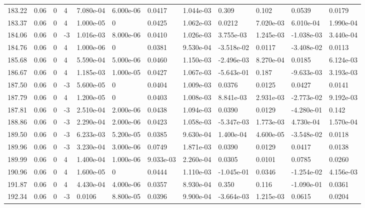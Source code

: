 \documentclass[preview]{standalone}
\begin{document}
{{{{{{{{{{\begin{tabular}{L{1.2cm}C{1.2cm} C{0.3cm}C{0.5cm} C{1.4cm}C{1.4cm} C{1.4cm}C{1.4cm} C{1.6cm}C{1.6cm} C{1.6cm}C{1.6cm}}
  183.22  &  0.06  & 0     &  4 &  7.080e-04  & 6.000e-06  &  0.0417&   1.044e-03& 0.309 & 0.102   &  0.0539 & 0.0179  \\ 
  183.37  &  0.06  & 0     &  4 &  1.000e-05  & 0  &  0.0425&   1.062e-03& 0.0212 & 7.020e-03   &  6.010e-04 & 1.990e-04  \\ 
  184.06  &  0.06  & 0     & -3 &  1.016e-03  & 8.000e-06  &  0.0410&   1.026e-03& 3.755e-03 & 1.245e-03   &  -1.038e-03 & 3.440e-04  \\ 
  184.76  &  0.06  & 0     &  4 &  1.000e-06  & 0  &  0.0381&   9.530e-04& -3.518e-02 & 0.0117   &  -3.408e-02 & 0.0113  \\ 
  185.68  &  0.06  & 0     &  4 &  5.590e-04  & 5.000e-06  &  0.0460&   1.150e-03& -2.496e-03 & 8.270e-04   &  0.0185 & 6.124e-03  \\ 
  186.67  &  0.06  & 0     &  4 &  1.185e-03  & 1.000e-05  &  0.0427&   1.067e-03& -5.643e-01 & 0.187   &  -9.633e-03 & 3.193e-03  \\ 
  187.50  &  0.06  & 0     & -3 &  5.600e-05  & 0  &  0.0404&   1.009e-03& 0.0376 & 0.0125   &  0.0427 & 0.0141  \\ 
  187.79  &  0.06  & 0     &  4 &  1.200e-05  & 0  &  0.0403&   1.008e-03& 8.841e-03 & 2.931e-03   &  -2.773e-02 & 9.192e-03  \\ 
  187.81  &  0.06  & 0     & -3 &  2.510e-04  & 2.000e-06  &  0.0438&   1.094e-03& 0.0390 & 0.0129   &  -4.280e-01 & 0.142  \\ 
  188.86  &  0.06  & 0     & -3 &  2.290e-04  & 2.000e-06  &  0.0423&   1.058e-03& -5.347e-03 & 1.773e-03   &  4.730e-04 & 1.570e-04  \\ 
  189.50  &  0.06  & 0     & -3 &  6.233e-03  & 5.200e-05  &  0.0385&   9.630e-04& 1.400e-04 & 4.600e-05   &  -3.548e-02 & 0.0118  \\ 
  189.96  &  0.06  & 0     & -3 &  3.230e-04  & 3.000e-06  &  0.0749&   1.871e-03& 0.0390 & 0.0129   &  0.0417 & 0.0138  \\ 
  189.99  &  0.06  & 0     &  4 &  1.400e-04  & 1.000e-06  &  9.033e-03&   2.260e-04& 0.0305 & 0.0101   &  0.0785 & 0.0260  \\ 
  190.96  &  0.06  & 0     &  4 &  1.600e-05  & 0  &  0.0444&   1.110e-03& -1.045e-01 & 0.0346   &  -1.254e-02 & 4.156e-03  \\ 
  191.87  &  0.06  & 0     &  4 &  4.430e-04  & 4.000e-06  &  0.0357&   8.930e-04& 0.350 & 0.116   &  -1.090e-01 & 0.0361  \\ 
  192.34  &  0.06  & 0     & -3 &  0.0106  & 8.800e-05  &  0.0396&   9.900e-04& -3.664e-03 & 1.215e-03   &  0.0615 & 0.0204  \\ 

\end{tabular}}}}}}}}}}}
\end{document}
